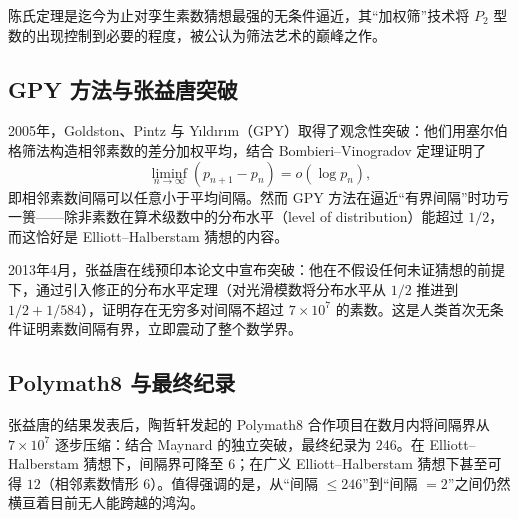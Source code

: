 陈氏定理是迄今为止对孪生素数猜想最强的无条件逼近，其“加权筛”技术将 $P_2$ 型数的出现控制到必要的程度，被公认为筛法艺术的巅峰之作。

\subsection{GPY 方法与张益唐突破}

2005年，Goldston、Pintz 与 Yıldırım（GPY）取得了观念性突破\cite{goldston2009primes}：他们用塞尔伯格筛法构造相邻素数的差分加权平均，结合 Bombieri--Vinogradov 定理证明了
\begin{equation}
    \liminf_{n \to \infty} (p_{n+1} - p_n) = o(\log p_n),
\end{equation}
即相邻素数间隔可以任意小于平均间隔。然而 GPY 方法在逼近“有界间隔”时功亏一篑——除非素数在算术级数中的分布水平（level of distribution）能超过 $1/2$，而这恰好是 Elliott--Halberstam 猜想的内容。

2013年4月，张益唐在线预印本论文中宣布突破\cite{zhang2014bounded}：他在不假设任何未证猜想的前提下，通过引入修正的分布水平定理（对光滑模数将分布水平从 $1/2$ 推进到 $1/2 + 1/584$），证明存在无穷多对间隔不超过 $7 \times 10^7$ 的素数。这是人类首次无条件证明素数间隔有界，立即震动了整个数学界。

\subsection{Polymath8 与最终纪录}

张益唐的结果发表后，陶哲轩发起的 Polymath8 合作项目在数月内将间隔界从 $7 \times 10^7$ 逐步压缩：结合 Maynard 的独立突破\cite{maynard2015small}，最终纪录为 $246$\cite{polymath2014variants}。在 Elliott--Halberstam 猜想下，间隔界可降至 $6$；在广义 Elliott--Halberstam 猜想下甚至可得 $12$（相邻素数情形 $6$）。值得强调的是，从“间隔 $\le 246$”到“间隔 $= 2$”之间仍然横亘着目前无人能跨越的鸿沟。
